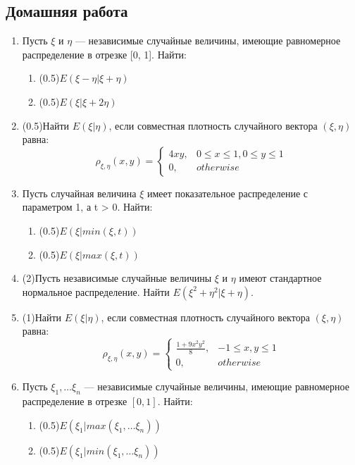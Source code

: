 \documentclass[a4paper, 14pt]{extarticle}
\begin{document}
\subsection*{Домашняя работа}
\begin{enumerate}
\item Пусть $\xi$ и $\eta$ — независимые случайные величины, имеющие
равномерное распределение в отрезке [0, 1]. Найти:
\begin{enumerate}
\item (0.5)$E(\xi - \eta|\xi + \eta)$
\item (0.5)$E(\xi|\xi + 2\eta)$
\end{enumerate}
\item (0.5)Найти $E(\xi|\eta)$, если совместная плотность случайного вектора
$(\xi, \eta)$ равна:
$$\rho_{\xi,\eta}(x,y) =\left\{
	\begin{array}{cc}
	4xy, & 0\leq x\leq 1, 0\leq y\leq 1 \\
	0, & otherwise
	\end{array}\right.$$

\item Пусть случайная величина $\xi$ имеет показательное распределение 
с параметром 1, а t > 0. Найти:
\begin{enumerate}
\item (0.5)$E(\xi| min(\xi, t))$
\item (0.5)$E(\xi| max(\xi, t))$
\end{enumerate}
\item (2)Пусть независимые случайные величины $\xi$ и $\eta$ имеют стандартное
 нормальное распределение. Найти $E(\xi^2 + \eta^2 |\xi + \eta)$.
\item (1)Найти $E(\xi|\eta)$, если совместная плотность случайного вектора
$(\xi, \eta)$ равна:
	$$\rho_{\xi,\eta}(x,y) =\left\{
	\begin{array}{cc}
	\frac{1+9x^2y^2}{8}, & -1\leq x,y\leq 1\\
	0, & otherwise
	\end{array}\right.$$

\item Пусть $\xi_1, \ldots \xi_n$ — независимые случайные величины, имеющие
 равномерное распределение в отрезке $[0, 1]$. Найти:
\begin{enumerate}
\item (0.5)$E(\xi_1 | max(\xi_1, \ldots \xi_n))$
\item (0.5)$E(\xi_1 | min(\xi_1, \ldots \xi_n))$
\end{enumerate}

\end{enumerate}	
\end{document}
